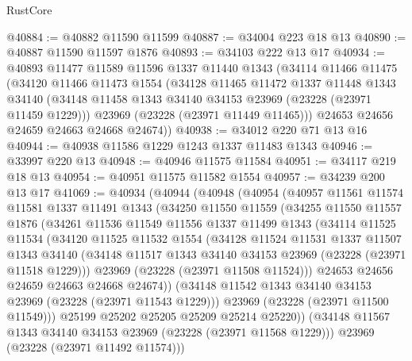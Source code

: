 \begin{lexlean}{RustCore}
\begin{coremodule}
@40884 := @40882 @11590 @11599
@40887 := @34004 @223 @18 @13
@40890 := @40887 @11590 @11597 @1876
@40893 := @34103 @222 @13 @17
@40934 := @40893
    @11477
    @11589
    @11596
    @1337
    @11440
    @1343
    (@34114
      @11466
      @11475
      (@34120
        @11466
        @11473
        @1554
        (@34128
          @11465
          @11472
          @1337
          @11448
          @1343
          @34140
          (@34148 @11458 @1343 @34140 @34153 @23969 (@23228 (@23971 @11459 @1229)))
          @23969
          (@23228 (@23971 @11449 @11465)))
        @24653
        @24656
        @24659
        @24663
        @24668
        @24674))
@40938 := @34012 @220 @71 @13 @16
@40944 := @40938 @11586 @1229 @1243 @1337 @11483 @1343
@40946 := @33997 @220 @13
@40948 := @40946 @11575 @11584
@40951 := @34117 @219 @18 @13
@40954 := @40951 @11575 @11582 @1554
@40957 := @34239 @200 @13 @17
@41069 := @40934
    (@40944
      (@40948
        (@40954
          (@40957
            @11561
            @11574
            @11581
            @1337
            @11491
            @1343
            (@34250
              @11550
              @11559
              (@34255
                @11550
                @11557
                @1876
                (@34261
                  @11536
                  @11549
                  @11556
                  @1337
                  @11499
                  @1343
                  (@34114
                    @11525
                    @11534
                    (@34120
                      @11525
                      @11532
                      @1554
                      (@34128
                        @11524
                        @11531
                        @1337
                        @11507
                        @1343
                        @34140
                        (@34148 @11517 @1343 @34140 @34153 @23969 (@23228 (@23971 @11518 @1229)))
                        @23969
                        (@23228 (@23971 @11508 @11524)))
                      @24653
                      @24656
                      @24659
                      @24663
                      @24668
                      @24674))
                  (@34148 @11542 @1343 @34140 @34153 @23969 (@23228 (@23971 @11543 @1229)))
                  @23969
                  (@23228 (@23971 @11500 @11549)))
                @25199
                @25202
                @25205
                @25209
                @25214
                @25220))
            (@34148 @11567 @1343 @34140 @34153 @23969 (@23228 (@23971 @11568 @1229)))
            @23969
            (@23228 (@23971 @11492 @11574)))

\end{coremodule}
\end{lexlean}
